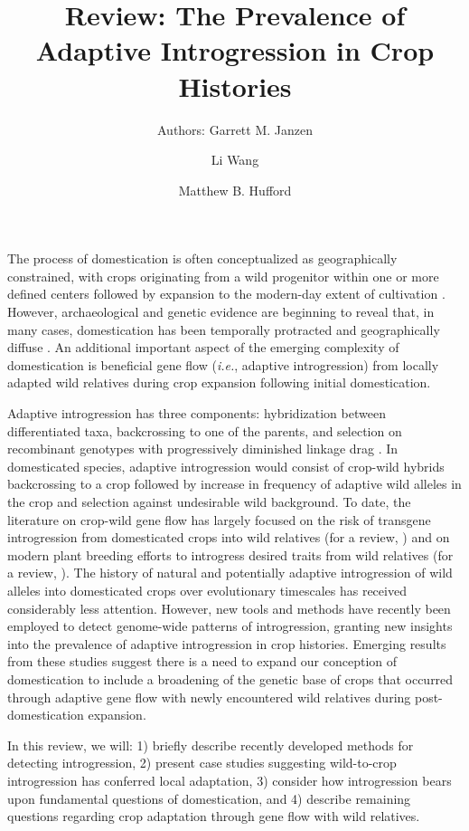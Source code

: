 \documentclass[11pt]{article}
\title{Review: The Prevalence of Adaptive Introgression in Crop Histories}
\author[1]{Authors: Garrett M. Janzen}%
\author[1]{Li Wang}
\author[1,*]{Matthew B. Hufford}
\affil[1]{Department of Ecology, Evolution, and Organismal Biology, Iowa State University, Ames, Iowa, USA}
\affil[*]{Correspondence: mhufford@iastate.edu (M.B. Hufford)}
\date{}
\begin{document}
\maketitle


The process of domestication is often conceptualized as geographically constrained, with crops originating from a wild progenitor within one or more defined centers followed by expansion to the modern-day extent of cultivation \cite{Harlan1992}.
However, archaeological and genetic evidence are beginning to reveal that, in many cases, domestication has been temporally protracted and geographically diffuse \cite{brown2009complex, Meyer2016, wang2017, zhou2017, Fuller2014}.
An additional important aspect of the emerging complexity of domestication is beneficial gene flow (\emph{i.e.}, adaptive introgression) from locally adapted wild relatives during crop expansion following initial domestication.


Adaptive introgression has three components: hybridization between differentiated taxa, backcrossing to one of the parents, and selection on recombinant genotypes with progressively diminished linkage drag \cite{barton2001role, Feuillet200824}.
In domesticated species, adaptive introgression would consist of crop-wild hybrids backcrossing to a crop followed by increase in frequency of adaptive wild alleles in the crop and selection against undesirable wild background.
To date, the literature on crop-wild gene flow has largely focused on the risk of transgene introgression from domesticated crops into wild relatives (for a review, \cite{stewart2003transgene}) and on modern plant breeding efforts to introgress desired traits from wild relatives (for a review, \cite{Dempewolf2017}).
The history of natural and potentially adaptive introgression of wild alleles into domesticated crops over evolutionary timescales has received considerably less attention.
However, new tools and methods have recently been employed to detect genome-wide patterns of introgression, granting new insights into the prevalence of adaptive introgression in crop histories.
Emerging results from these studies suggest there is a need to expand our conception of domestication to include a broadening of the genetic base of crops that occurred through adaptive gene flow with newly encountered wild relatives during post-domestication expansion.

In this review, we will: 1) briefly describe recently developed methods for detecting introgression, 2) present case studies suggesting wild-to-crop introgression has conferred local adaptation, 3) consider how introgression bears upon fundamental questions of domestication, and 4) describe remaining questions regarding crop adaptation through gene flow with wild relatives.
\end{document}
